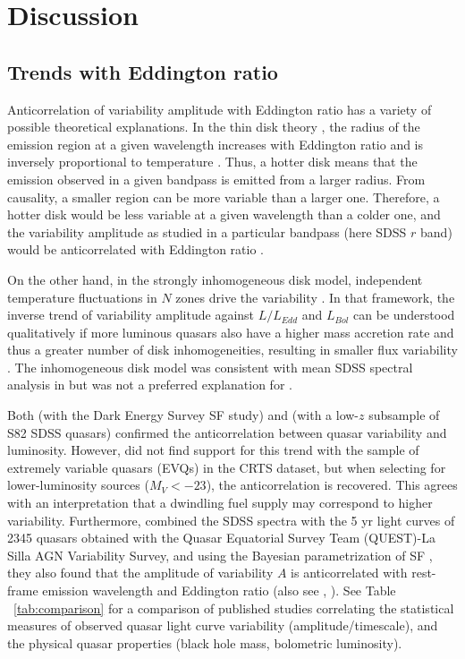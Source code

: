 \documentclass[twocolumn]{aastex62}
\begin{document}
%
%
%
%
%
%
%
%
%
\section{Discussion}
\label{sec:discussion}
\subsection{Trends with Eddington ratio}
Anticorrelation of  variability amplitude with Eddington ratio  has a variety of possible theoretical explanations. In the thin disk theory \citep{shakura1973, frank2002, netzer2013}, the radius of the emission region at a given wavelength increases with Eddington ratio and is inversely proportional to temperature \citep{rakshit2017}. Thus, a hotter disk means that the emission observed in a given bandpass is emitted from a larger radius. From causality, a smaller region can be more variable than a larger one. Therefore, a  hotter disk would be less variable at a given wavelength than a colder one, and  the variability amplitude as studied in a particular bandpass (here SDSS $r$ band) would be anticorrelated with Eddington ratio \citep{fausnaugh2016,edelson2015}. 

On the other hand, in the strongly inhomogeneous disk model, independent temperature fluctuations in $N$ zones drive the variability \citep{dexter2011}. In that framework, the inverse trend of variability amplitude against $L/L_{Edd}$  and $L_{Bol}$  can be understood qualitatively if more luminous quasars also have a higher mass accretion rate and thus a greater number of disk inhomogeneities, resulting in smaller flux variability \citep{simm2016}. The inhomogeneous disk model was consistent with mean SDSS spectral analysis in \citet{ruan2014} but was not a preferred explanation for \citet{kokubo2015}. 

Both \cite{rumbaugh2018} (with the Dark Energy Survey SF study) and  \citet{sun2018}  (with a low-$z$ subsample of S82 SDSS quasars) confirmed the anticorrelation between quasar variability and luminosity. However, \citet{graham2020} did not find support for this trend with the sample of extremely variable quasars (EVQs) in the CRTS dataset,  but when selecting for lower-luminosity sources ($M_{V} < -23$), the anticorrelation is recovered. This agrees with an interpretation that a dwindling fuel supply may correspond to higher variability. Furthermore, \citet{sanchez2018} combined the SDSS spectra with the 5 yr light curves of 2345 quasars obtained with the Quasar Equatorial Survey Team (QUEST)-La Silla AGN Variability Survey, and  using the Bayesian parametrization of SF \citep{schmidt2010}, they also found that the amplitude of variability $A$ is anticorrelated with rest-frame emission wavelength  and Eddington ratio (also see \citealt{simm2016}, \citealt{rakshit2017}). See Table ~\ref{tab:comparison} for a comparison of published studies correlating the statistical measures of observed quasar light curve variability (amplitude/timescale),  and the physical quasar properties (black hole mass, bolometric luminosity). 
\end{document}
